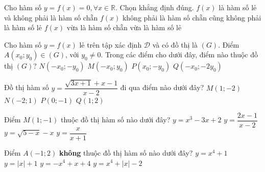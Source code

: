 \begin{ex}%
	Cho hàm số  $y = f(x)=0, \forall x\in\mathbb{R}$. Chọn khẳng định đúng.
	{$f(x)$ là hàm số lẻ và không phải là hàm số chẵn}
	{$f(x)$ không phải là hàm số chẵn cũng không phải là hàm số lẻ}
	{\True $f(x)$ vừa là hàm số chẵn vừa là hàm số lẻ}
\end{ex}

\begin{ex}%
	Cho hàm số $y=f(x)$ lẻ trên tập xác định $\mathscr{D}$ và có đồ thị là $(G)$. Điểm $A(x_0;y_0)\in (G)$, với $y_0\neq 0$. Trong các điểm cho dưới đây, điểm nào thuộc đồ thị $(G)$? 
	\choice
	{\True $N(-x_0;-y_0)$}
	{$M(-x_0;y_0)$}
	{$P(x_0;-y_0)$}
	{$Q(-x_0;-2y_0)$}
\end{ex}

\begin{ex}%
	Đồ thị hàm số $y=\dfrac{\sqrt{3x+1}+x-1}{x-2}$ đi qua điểm nào dưới đây?
	\choice
	{\True $M(1;-2)$}
	{$N(-2;1)$}
	{$P(0;-1)$}
	{$Q(1;2)$}
\end{ex}

\begin{ex}%
	Điểm $M(1;-1)$ thuộc đồ thị hàm số nào dưới đây?
	\choice
	{$y=x^3-3x+2$}
	{\True $y=\dfrac{2x-1}{x-2}$}
	{$y=\sqrt{5-x}-x$}
	{$y=\dfrac{x}{x+1}$}
\end{ex}

\begin{ex}%
	Điểm $A(-1;2)$ {\bf không} thuộc đồ thị hàm số nào dưới đây?
	\choice
	{$y=x^4+1$}
	{$y=|x|+1$}
	{$y=-x^4+x+4$}
	{\True $y=x^4+|x|-2$}
\end{ex}

